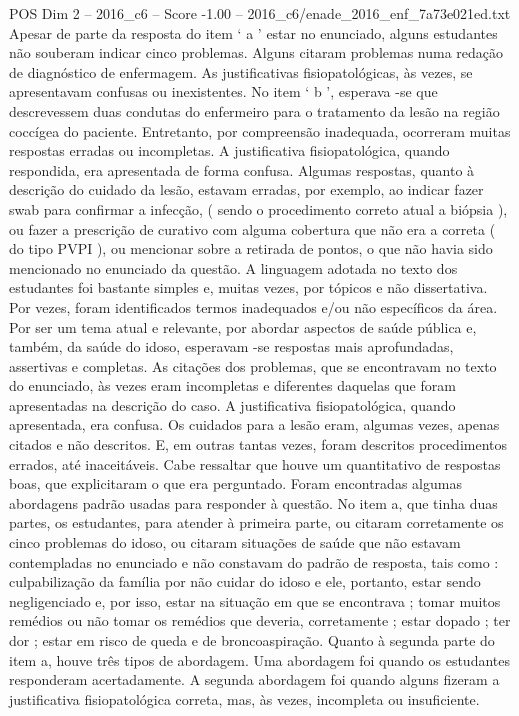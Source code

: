 \begin{textsample}{POS Dim 2 – 2016\_c6 – Score -1.00 – 2016\_c6/enade\_2016\_enf\_7a73e021ed.txt}
Apesar de parte da resposta do item ‘ a ’ estar no enunciado, alguns estudantes não souberam indicar cinco problemas.
Alguns citaram problemas numa redação de diagnóstico de enfermagem.
As justificativas fisiopatológicas, às vezes, se apresentavam confusas ou inexistentes.
No item ‘ b ’, esperava -se que descrevessem duas condutas do enfermeiro para o tratamento da lesão na região coccígea do paciente.
Entretanto, por compreensão inadequada, ocorreram muitas respostas erradas ou incompletas.
A justificativa fisiopatológica, quando respondida, era apresentada de forma confusa.
Algumas respostas, quanto à descrição do cuidado da lesão, estavam erradas, por exemplo, ao indicar fazer swab para confirmar a infecção, ( sendo o procedimento correto atual a biópsia ), ou fazer a prescrição de curativo com alguma cobertura que não era a correta ( do tipo PVPI ), ou mencionar sobre a retirada de pontos, o que não havia sido mencionado no enunciado da questão.
A linguagem adotada no texto dos estudantes foi bastante simples e, muitas vezes, por tópicos e não dissertativa.
Por vezes, foram identificados termos inadequados e/ou não específicos da área.
Por ser um tema atual e relevante, por abordar aspectos de saúde pública e, também, da saúde do idoso, esperavam -se respostas mais aprofundadas, assertivas e completas.
As citações dos problemas, que se encontravam no texto do enunciado, às vezes eram incompletas e diferentes daquelas que foram apresentadas na descrição do caso.
A justificativa fisiopatológica, quando apresentada, era confusa.
Os cuidados para a lesão eram, algumas vezes, apenas citados e não descritos.
E, em outras tantas vezes, foram descritos procedimentos errados, até inaceitáveis.
Cabe ressaltar que houve um quantitativo de respostas boas, que explicitaram o que era perguntado.
Foram encontradas algumas abordagens padrão usadas para responder à questão.
No item a, que tinha duas partes, os estudantes, para atender à primeira parte, ou citaram corretamente os cinco problemas do idoso, ou citaram situações de saúde que não estavam contempladas no enunciado e não constavam do padrão de resposta, tais como : culpabilização da família por não cuidar do idoso e ele, portanto, estar sendo negligenciado e, por isso, estar na situação em que se encontrava ; tomar muitos remédios ou não tomar os remédios que deveria, corretamente ; estar dopado ; ter dor ; estar em risco de queda e de broncoaspiração.
Quanto à segunda parte do item a, houve três tipos de abordagem.
Uma abordagem foi quando os estudantes responderam acertadamente.
A segunda abordagem foi quando alguns fizeram a justificativa fisiopatológica correta, mas, às vezes, incompleta ou insuficiente.

\end{textsample}
